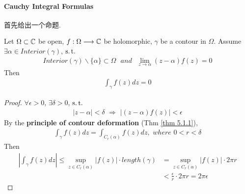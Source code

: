 \paragraph{Cauchy Integral Formulas}
首先给出一个命题.
\begin{proposition}\label{prop 5.2.1}
	Let $\Omega \subset \mathbb{C}$ be open, $f : \Omega \longrightarrow \mathbb{C}$ be holomorphic, $\gamma$ be a contour in $\Omega$. Assume $\exists \alpha \in Interior(\gamma)$, $\operatorname{s.t.}$
	\begin{align}
		Interior(\gamma) \backslash \{ \alpha \} \subset \Omega \,\,\,\, and \,\,\,\, \lim_{z \to \alpha}{(z - \alpha)f(z)} = 0
	\end{align}
	Then
	\begin{align}
		\int_{\gamma}{f(z) dz} = 0
	\end{align}
	
	\vspace{2em}
	\begin{proof}
		$\forall \epsilon > 0$, $\exists \delta > 0$, $\operatorname{s.t.}$
		\begin{align}
			\left| z - \alpha \right| < \delta \,\, \Rightarrow \,\, \left| (z - \alpha) f(z) \right| < \epsilon
		\end{align}
		By the \textbf{principle of contour deformation} (Thm \ref{thm 5.1.1}),
		\begin{align}
			\int_{\gamma}{f(z) dz} = \int_{C_{r}(\alpha)}{f(z) dz} , \,\, where \,\, 0 < r < \delta
		\end{align}
		Then
		\begin{align}
			\left| \int_{\gamma}{f(z) dz} \right| 
			\leq \sup_{z \in C_{r}(\alpha)}{\left| f(z) \right|} \cdot length(\gamma) 
			&= \sup_{z \in C_{r}(\alpha)}{\left| f(z) \right|} \cdot 2 \pi r \\
			&< \frac{\epsilon}{r} \cdot 2 \pi r = 2 \pi \epsilon
		\end{align}
	\end{proof}
\end{proposition}

